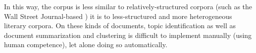 In this way, the corpus is less similar to relatively-structured corpora (such as the Wall Street Journal-based \citeauthor{PTB}) it is to less-structured and more heterogeneous literary corpora. On these kinds of documents, topic identification as well as document summarization and clustering is difficult to implement manually (using human competence), let alone doing so automatically.
